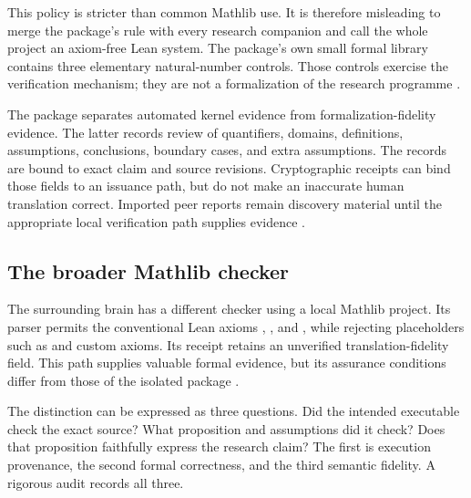 This policy is stricter than common Mathlib use. It is therefore misleading to merge the package's rule with every research companion and call the whole project an axiom-free Lean system. The package's own small formal library contains three elementary natural-number controls. Those controls exercise the verification mechanism; they are not a formalization of the research programme \citep{leannatural,leancontrols}.

The package separates automated kernel evidence from formalization-fidelity evidence. The latter records review of quantifiers, domains, definitions, assumptions, conclusions, boundary cases, and extra assumptions. The records are bound to exact claim and source revisions. Cryptographic receipts can bind those fields to an issuance path, but do not make an inaccurate human translation correct. Imported peer reports remain discovery material until the appropriate local verification path supplies evidence \citep{leanimplementation,matharchitecture}.

\subsection{The broader Mathlib checker}

The surrounding brain has a different checker using a local Mathlib project. Its parser permits the conventional Lean axioms , , and , while rejecting placeholders such as  and custom axioms. Its receipt retains an unverified translation-fidelity field. This path supplies valuable formal evidence, but its assurance conditions differ from those of the isolated package \citep{leanbroad,leanparser}.

The distinction can be expressed as three questions. Did the intended executable check the exact source? What proposition and assumptions did it check? Does that proposition faithfully express the research claim? The first is execution provenance, the second formal correctness, and the third semantic fidelity. A rigorous audit records all three.

